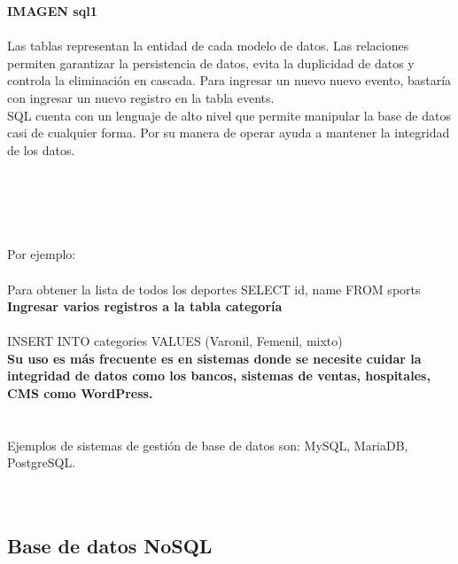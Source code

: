 \documentclass[twoside,twocolumn]{article}
\begin{document}
\begin{flushright}
\begin{itemize}
\textbf{IMAGEN sql1}\\
\textbf{}\\
Las tablas representan la entidad de cada modelo de datos. Las relaciones permiten garantizar la persistencia de datos, evita la duplicidad de datos y controla la eliminación en cascada. Para ingresar un nuevo nuevo evento, bastaría con ingresar un nuevo registro en la tabla events.\textbf{}\\
SQL cuenta con un lenguaje de alto nivel que permite manipular la base de datos casi de cualquier forma. Por su manera de operar ayuda a mantener la integridad de los datos.
\textbf{}\\
\textbf{}\\
\textbf{}\\
\textbf{}\\
\textbf{}\\
\textbf{}\\
 Por ejemplo:
\textbf{}\\
\textbf{}\\
Para obtener la lista de todos los deportes
SELECT id, name FROM sports
\textbf{}\\
\textbf{Ingresar varios registros a la tabla categoría}\\
\textbf{}\\
INSERT INTO categories VALUES (Varonil, Femenil, mixto)
\textbf{}\\
\textbf{Su uso es más frecuente es en sistemas donde se necesite cuidar la integridad de datos como los bancos, sistemas de ventas, hospitales, CMS como WordPress.}\\
\textbf{}\\
\textbf{}\\
Ejemplos de sistemas de gestión de base de datos son: MySQL, MariaDB, PostgreSQL.\textbf{}\\

 \textbf{}\\
\textbf{}\\


\subsection{Base de datos NoSQL}


\end{itemize}
\end{flushright}
\end{document}
